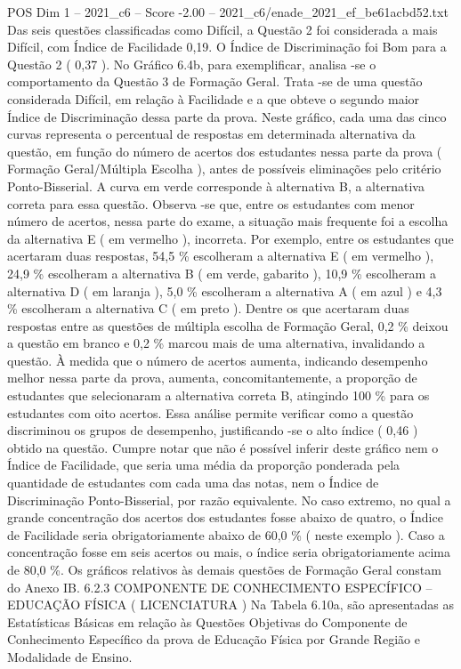 \begin{textsample}{POS Dim 1 – 2021\_c6 – Score -2.00 – 2021\_c6/enade\_2021\_ef\_be61acbd52.txt}
Das seis questões classificadas como Difícil, a Questão 2 foi considerada a mais Difícil, com Índice de Facilidade 0,19.
O Índice de Discriminação foi Bom para a Questão 2 ( 0,37 ).
No Gráfico 6.4b, para exemplificar, analisa -se o comportamento da Questão 3 de Formação Geral.
Trata -se de uma questão considerada Difícil, em relação à Facilidade e a que obteve o segundo maior Índice de Discriminação dessa parte da prova.
Neste gráfico, cada uma das cinco curvas representa o percentual de respostas em determinada alternativa da questão, em função do número de acertos dos estudantes nessa parte da prova ( Formação Geral/Múltipla Escolha ), antes de possíveis eliminações pelo critério Ponto-Bisserial.
A curva em verde corresponde à alternativa B, a alternativa correta para essa questão.
Observa -se que, entre os estudantes com menor número de acertos, nessa parte do exame, a situação mais frequente foi a escolha da alternativa E ( em vermelho ), incorreta.
Por exemplo, entre os estudantes que acertaram duas respostas, 54,5 \% escolheram a alternativa E ( em vermelho ), 24,9 \% escolheram a alternativa B ( em verde, gabarito ), 10,9 \% escolheram a alternativa D ( em laranja ), 5,0 \% escolheram a alternativa A ( em azul ) e 4,3 \% escolheram a alternativa C ( em preto ).
Dentre os que acertaram duas respostas entre as questões de múltipla escolha de Formação Geral, 0,2 \% deixou a questão em branco e 0,2 \% marcou mais de uma alternativa, invalidando a questão.
À medida que o número de acertos aumenta, indicando desempenho melhor nessa parte da prova, aumenta, concomitantemente, a proporção de estudantes que selecionaram a alternativa correta B, atingindo 100 \% para os estudantes com oito acertos.
Essa análise permite verificar como a questão discriminou os grupos de desempenho, justificando -se o alto índice ( 0,46 ) obtido na questão.
Cumpre notar que não é possível inferir deste gráfico nem o Índice de Facilidade, que seria uma média da proporção ponderada pela quantidade de estudantes com cada uma das notas, nem o Índice de Discriminação Ponto-Bisserial, por razão equivalente.
No caso extremo, no qual a grande concentração dos acertos dos estudantes fosse abaixo de quatro, o Índice de Facilidade seria obrigatoriamente abaixo de 60,0 \% ( neste exemplo ).
Caso a concentração fosse em seis acertos ou mais, o índice seria obrigatoriamente acima de 80,0 \%.
Os gráficos relativos às demais questões de Formação Geral constam do Anexo IB. 6.2.3 COMPONENTE DE CONHECIMENTO ESPECÍFICO – EDUCAÇÃO FÍSICA ( LICENCIATURA ) Na Tabela 6.10a, são apresentadas as Estatísticas Básicas em relação às Questões Objetivas do Componente de Conhecimento Específico da prova de Educação Física por Grande Região e Modalidade de Ensino.

\end{textsample}
